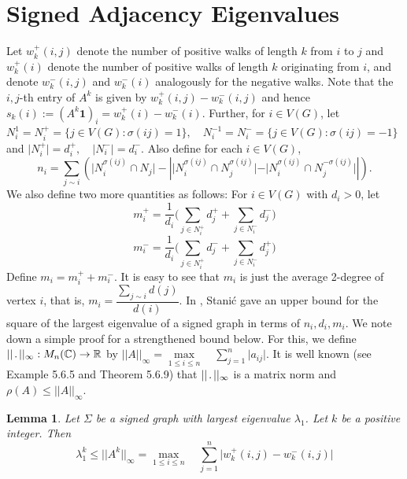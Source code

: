 \documentclass[12pt]{article}
\theoremstyle{plain}
\newtheorem{lemma}[theorem]{Lemma}
\numberwithin{equation}{section}
\begin{document}
	\section{Signed Adjacency Eigenvalues}\label{Signed_Adjacency}
	
	Let $w_{k}^{+}(i,j)$ denote the number of positive walks of length $k$ from $i$ to $j$ and $w_{k}^{+}(i)$ denote the number of positive walks of length $k$ originating from $i$, and denote $w_{k}^{-}(i,j)$ and $w_{k}^{-}(i)$ analogously for the negative walks. Note that the $i,j$-th entry of $A^k$ is given by $w_{k}^{+}(i,j)-w_{k}^{-}(i,j)$ and hence $s_k(i):=(A^k\mathbf{1})_i= w_{k}^{+}(i)-w_{k}^{-}(i)$. Further, for $i \in V(G)$, let $N^1_i= N^+_i= \{j \in V(G) : \sigma(ij)=1\}, \quad N^{-1}_i=N^{-}_i= \{j \in V(G) : \sigma(ij)=-1\}$ and $\vert N^+_i \vert = d^+_i, \quad \vert N^{-}_i \vert = d^-_i$. Also define for each $i \in V(G)$, \[
	n_i=\sum_{j\sim i}
	\left(
	\vert N_i^{\sigma(ij)}\cap N_j\vert
	-
	\left | \vert N_i^{\sigma(ij)}\cap N_j^{\sigma(ij)}\vert
	-
	\vert N_i^{\sigma(ij)}\cap N_j^{-\sigma(ij)}\vert \right |
	\right).
	\]We also define two more quantities as follows: For $i \in V(G)$ with $d_i > 0$, let \\
	$$ m_i^+= \dfrac{1}{d_i}\bigg(\sum \limits_{j \in N_i^+}d_j^+ + \sum \limits_{j \in N_i^-}d_j^-\bigg)$$
	$$ m_i^-= \dfrac{1}{d_i}\bigg(\sum \limits_{j \in N_i^+}d_j^- + \sum \limits_{j \in N_i^-}d_j^+\bigg)$$ Define $m_i=m_i^++m_i^-$. It is easy to see that $m_i$ is just the average 2-degree of vertex $i$, that is, $m_i= \dfrac{\sum \limits_{j \sim i} d(j)}{d(i)}.$ In \cite{Stanic2019bounding}, Stani{\'c} gave an upper bound for the square of the largest eigenvalue of a signed graph in terms of $n_i,d_i,m_i$. We note down a simple proof for a strengthened bound below. For this, we define $\vert\vert \hspace{0.5mm} .\hspace{0.5mm}  \vert \vert_{\infty} : M_n(\mathbb{C) \rightarrow \mathbb{R}} $ by $\vert\vert  A  \vert \vert_{\infty}= \max \limits_{1\leq i \leq n}\quad\sum \limits_{j=1}^{n}\vert a_{ij}\vert$. It is well known (see \cite{MR2978290} Example 5.6.5 and Theorem 5.6.9) that $\vert\vert \hspace{0.5mm} .\hspace{0.5mm}  \vert \vert_{\infty}$ is a matrix norm and $\rho(A) \leq \vert \vert A  \vert \vert_{\infty}$.
	\begin{lemma}\label{norm_bound}
		Let $\Sigma$ be a signed graph with largest eigenvalue $\lambda_1$. Let $k$ be a positive integer. Then 
		$$\lambda_1^k \leq \vert \vert A^k \vert \vert_{\infty}= \max \limits_{1\leq i \leq n}\quad\sum \limits_{j=1}^{n}\vert w_k^+(i,j)-w_k^-(i,j)\vert$$
	\end{lemma}
\end{document}
